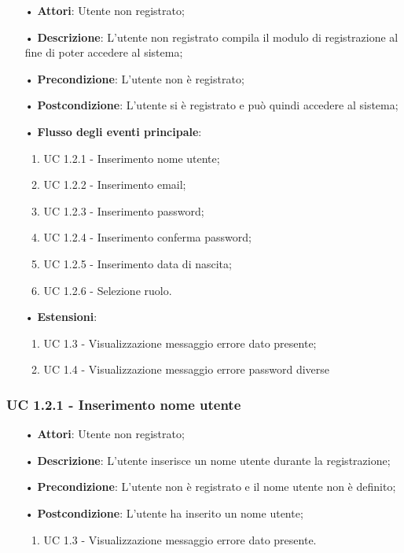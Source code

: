 \begin{itemize}
	\item[•]\textbf{Attori}: Utente non registrato;
	\item[•]\textbf{Descrizione}: L'utente non registrato compila il modulo di registrazione al fine di poter accedere al sistema;
	\item[•]\textbf{Precondizione}: L'utente non è registrato;
	\item[•]\textbf{Postcondizione}: L'utente si è registrato e può quindi accedere al sistema;
	\item[•]\textbf{Flusso degli eventi principale}:
	\begin{enumerate}
		\item UC 1.2.1 - Inserimento nome utente;
		\item UC 1.2.2 - Inserimento email;
		\item UC 1.2.3 - Inserimento password;
		\item UC 1.2.4 - Inserimento conferma password;
		\item UC 1.2.5 - Inserimento data di nascita;
		\item UC 1.2.6 - Selezione ruolo.
	\end{enumerate}
	\item[•]\textbf{Estensioni}:
	\begin{enumerate}
		\item UC 1.3 - Visualizzazione messaggio errore dato presente;
		\item UC 1.4 - Visualizzazione messaggio errore password diverse
	\end{enumerate}
\end{itemize}

\subsubsection{UC 1.2.1 - Inserimento nome utente}
\begin{itemize}
	\item[•]\textbf{Attori}: Utente non registrato;
	\item[•]\textbf{Descrizione}: L'utente inserisce un nome utente durante la registrazione;
	\item[•]\textbf{Precondizione}: L'utente non è registrato e il nome utente non è definito;
	\item[•]\textbf{Postcondizione}: L'utente ha inserito un nome utente;
	\begin{enumerate}
		\item UC 1.3 - Visualizzazione messaggio errore dato presente.
	\end{enumerate}
\end{itemize}

